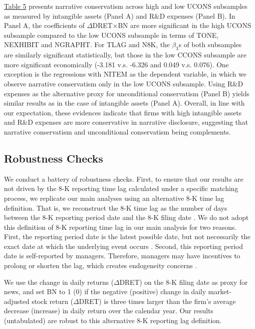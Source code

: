\documentclass[letterpaper,12pt]{article}
\begin{document}
\begin{spacing}{1.5}
\hyperref[T5]{Table 5} presents narrative conservatism across high and low UCONS subsamples as measured by intangible assets (Panel A) and R\&D expenses (Panel B). In Panel A, the coefficients of $\Delta$DRET$\times$BN are more significant in the high UCONS subsample compared to the low UCONS subsample in terms of TONE, NEXHIBIT and NGRAPHT. For TLAG and N8K, the $\beta_3$s of both subsamples are similarly significant statistically, but those in the low CCONS subsample are more significant economically (-3.181 v.s. -6.326 and 0.049 v.s. 0.076). One exception is the regressions with NITEM as the dependent variable, in which we observe narrative conservatism only in the low UCONS subsample. Using R\&D expenses as the alternative proxy for unconditional conservatism (Panel B) yields similar results as in the case of intangible assets (Panel A). Overall, in line with our expectation, these evidences indicate that firms with high intangible assets and R\&D expenses are more conservative in narrative disclosure, suggesting that narrative conservatism and unconditional conservatism being complements.

\subsection{Robustness Checks}
\noindent We conduct a battery of robustness checks. 
First, to ensure that our results are not driven by the 8-K reporting time lag calculated under a specific matching process, we replicate our main analyses using an alternative 8-K time lag definition. That is, we reconstruct the 8-K time lag as the number of days between the 8-K reporting period date and the 8-K filing date \cite{carterRelevanceForm8K1999, niessnerStrategicDisclosureTiming2015, chapmanInformationOverloadDisclosure2019}. We do not adopt this definition of 8-K reporting time lag in our main analysis for two reasons. First, the reporting period date is the latest possible date, but not necessarily the exact date at which the underlying event occurs \cite{secFinalRuleAdditional2004}. Second, this reporting period date is self-reported by managers. Therefore, managers may have incentives to prolong or shorten the lag, which creates endogeneity concerns \cite{chapmanInformationOverloadDisclosure2019}.

We use the change in daily returns ($\Delta$DRET) on the 8-K filing date as proxy for news, and set BN to 1 (0) if the negative (positive) change in daily market-adjusted stock return ($\Delta$DRET) is three times larger than the firm's average decrease (increase) in daily return over the calendar year. Our results (untabulated) are robust to this alternative 8-K reporting lag definition. 


\end{spacing}
\end{document}
